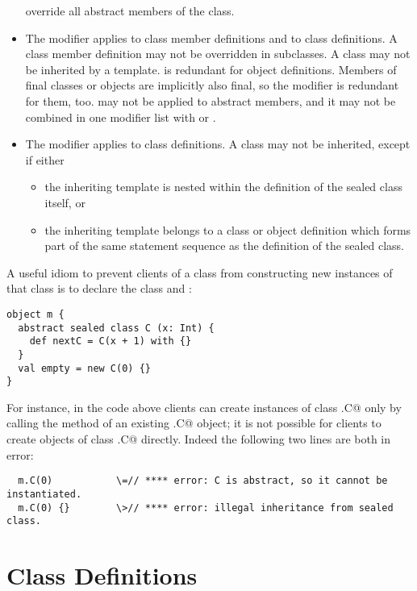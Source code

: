 \documentclass[11pt]{report}
\begin{document}
\begin{itemize}
override all abstract members of the class.
\item
The \verb@final@ modifier applies to class member definitions and to
class definitions. A \verb@final@ class member definition may not be
overridden in subclasses. A \verb@final@ class may not be inherited by
a template. \verb@final@ is redundant for object definitions.  Members
of final classes or objects are implicitly also final, so the
\verb@final@ modifier is redundant for them, too.  \verb@final@ may
not be applied to abstract members, and it may not be combined in one
modifier list with \verb@private@ or \verb@sealed@.
\item
The \verb@sealed@ modifier applies to class definitions. A
\verb@sealed@ class may not be inherited, except if either
\begin{itemize}
\item
the inheriting template is nested within the definition of the sealed
class itself, or
\item
the inheriting template belongs to a class or object definition which
forms part of the same statement sequence as the definition of the
sealed class.
\end{itemize}
\end{itemize}

\example A useful idiom to prevent clients of a class from
constructing new instances of that class is to declare the class
\verb@abstract@ and \verb@sealed@:

\begin{verbatim}
object m {
  abstract sealed class C (x: Int) {
    def nextC = C(x + 1) with {}
  }
  val empty = new C(0) {}
}
\end{verbatim}
For instance, in the code above clients can create instances of class
\verb@m.C@ only by calling the \verb@nextC@ method of an existing \verb@m.C@
object; it is not possible for clients to create objects of class
\verb@m.C@ directly. Indeed the following two lines are both in error:

\begin{verbatim}
  m.C(0)           \=// **** error: C is abstract, so it cannot be instantiated.
  m.C(0) {}        \>// **** error: illegal inheritance from sealed class.
\end{verbatim}

\section{Class Definitions}
\label{sec:classes}
\end{document}
